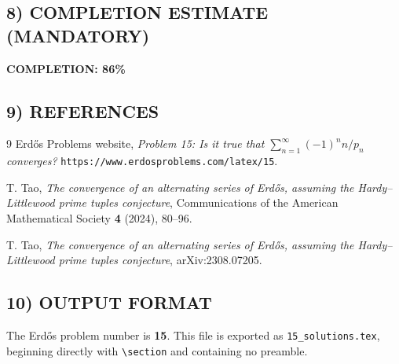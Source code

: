 \subsection{8) COMPLETION ESTIMATE (MANDATORY)}

\noindent\textbf{COMPLETION: 86\%}

\subsection{9) REFERENCES}

\begin{thebibliography}{9}
Erd\H{o}s Problems website,
\emph{Problem 15: Is it true that $\sum_{n=1}^{\infty} (-1)^n n/p_n$ converges?}
\texttt{https://www.erdosproblems.com/latex/15}.

T. Tao,
\emph{The convergence of an alternating series of Erd\H{o}s, assuming the Hardy--Littlewood prime tuples conjecture},
Communications of the American Mathematical Society \textbf{4} (2024), 80--96.

T. Tao,
\emph{The convergence of an alternating series of Erd\H{o}s, assuming the Hardy--Littlewood prime tuples conjecture},
arXiv:2308.07205.
\end{thebibliography}

\subsection{10) OUTPUT FORMAT}

The Erd\H{o}s problem number is \textbf{15}.  This file is exported as \texttt{15\_solutions.tex}, beginning directly with \verb|\section| and containing no preamble.
